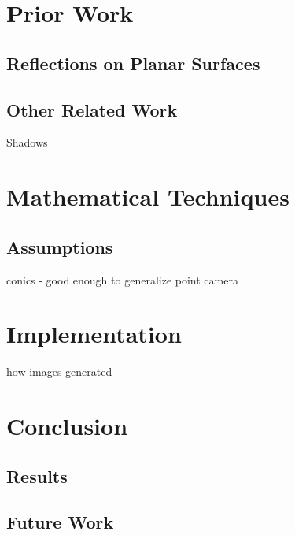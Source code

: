 \documentclass{article}
\begin{document}

\pagestyle{plain}





\section{Prior Work}
\subsection{Reflections on Planar Surfaces}
\subsection{Other Related Work}
Shadows

\section{Mathematical Techniques}
\subsection{Assumptions}
conics - good enough to generalize
point camera

\section{Implementation}
how images generated


\section{Conclusion}
\subsection{Results}
\subsection{Future Work}



\appendix
%
%
\end{document}
